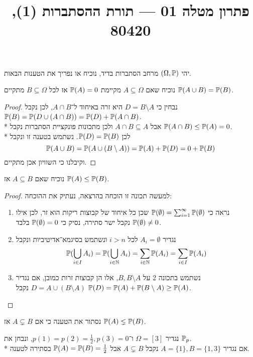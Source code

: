 
\title{פתרון מטלה 01 --- תורת ההסתברות (1), 80420}


\maketitle
\maketitleprint{}

\Question{}
יהי $(\Omega, \mathbb{P})$ מרחב הסתברות בדיד, נוכיח או נפריך את הטענות הבאות.

\Subquestion{}
נוכיח שאם $A \subseteq \Omega$ מקיימת $\mathbb{P}(A) = 0$ אז לכל $B \subseteq \Omega$ מתקיים $\mathbb{P}(A \cup B) = \mathbb{P}(B)$.
\begin{proof}
	נבחין כי $D = B \setminus A$ היא זרה באיחוד ל־$A \cap B$, לכן נקבל $\mathbb{P}(B) = \mathbb{P}(D \cup (A \cap B)) = \mathbb{P}(D) + \mathbb{P}(A \cap B)$. \\*
	אבל $A \cap B \subseteq A$ ולכן מתכונות פונקציית הסתברות נקבל $\mathbb{P}(A \cap B) \le \mathbb{P}(A) = 0$. \\*
	לכן $\mathbb{P}(D) = \mathbb{P}(B)$. נשתמש בטענה זו ונקבל
	\[
		\mathbb{P}(A \cup B) = \mathbb{P}(A \cup (B \setminus A)) = \mathbb{P}(A) + \mathbb{P}(D) = 0 + \mathbb{P}(B)
	\]
	וקיבלנו כי השוויון אכן מתקיים.
\end{proof}

\Subquestion{}
נוכיח שאם $A \subseteq B$ אז $\mathbb{P}(A) \le \mathbb{P}(B)$.
\begin{proof}
	למעשה תכונה זו הוכחה בהרצאה, נעתיק את ההוכחה:
	\begin{enumerate}
		\item נראה כי $\mathbb{P}(\emptyset) = \sum_{i = 1}^\infty \mathbb{P}(\emptyset)$ שכן כל איחוד של קבוצות ריקות הוא זר, לכן אילו $\mathbb{P}(\emptyset) \ne 0$ נקבל ישר סתירה, נסיק כי $\mathbb{P}(\emptyset) = 0$ בלבד.
		\item נגדיר $A_i = \emptyset$ לכל $i > n$ ונשתמש בסיגמא־אדיטיביות ונקבל
			\[
				\mathbb{P}(\bigcup_{i \in I} A_i)
				= \mathbb{P}(\bigcup_{i \in \mathbb{N}} A_i)
				= \sum_{i \in \mathbb{N}} \mathbb{P}(A_i)
				= \sum_{i \in I} \mathbb{P}(A_i)
			\]
		\item נשתמש בתכונה 2 על $B, B \setminus A$, אלו הן קבוצות זרות כמובן, אם נגדיר $D = A \cup (B \setminus A)$ נקבל $\mathbb{P}(D) = \mathbb{P}(A) + \mathbb{P}(B \setminus A) \ge \mathbb{P}(A)$.
	\end{enumerate}
\end{proof}

\Subquestion{}
נסתור את הטענה כי אם $A \subsetneq B$ אז $\mathbb{P}(A) \lneq \mathbb{P}(B)$.
\begin{solution}
	נגדיר $\Omega = [3]$ ו־$p(1) = p(2) = \frac{1}{2}, p(3) = 0$, ונבחן את $\mathbb{P}_p$. \\*
	אם נגדיר $A = \{ 1 \}, B = \{ 1, 3 \}$ נקבל $A \subsetneq B$ אבל $\mathbb{P}(A) = \mathbb{P}(B) = \frac{1}{2}$ בסתירה לטענה.
\end{solution}

